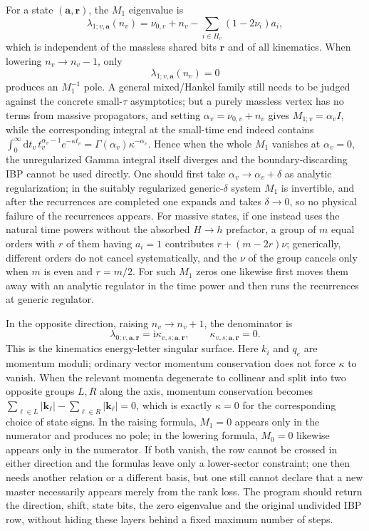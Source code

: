 \documentclass[11pt,a4paper]{article}
\newcommand{\dd}{\mathrm d}
\newcommand{\ii}{\mathrm i}
\begin{document}
For a state $(\bm a,\bm r)$, the $M_1$ eigenvalue is
\begin{equation}
 \lambda_{1;v,\bm a}(n_v)
 =\nu_{0,v}+n_v
 -\sum_{i\in H_v}(1-2\nu_i)a_i,
 \label{eq:M1-general-eigenvalue}
\end{equation}
which is independent of the massless shared bits $\bm r$ and of all kinematics. When lowering $n_v\to n_v-1$, only
\begin{equation}
 \lambda_{1;v,\bm a}(n_v)=0
 \label{eq:M1-lowering-resonance}
\end{equation}
produces an $M_1^{-1}$ pole. A general mixed/Hankel family still needs to be judged against the concrete small-$\tau$ asymptotics; but a purely massless vertex has no terms from massive propagators, and setting $\alpha_v=\nu_{0,v}+n_v$ gives $M_{1;v}=\alpha_v I$, while the corresponding integral at the small-time end indeed contains $\int_0^\infty\!\dd t_v\,t_v^{\alpha_v-1}e^{-\kappa t_v}=\Gamma(\alpha_v)\kappa^{-\alpha_v}$. Hence when the whole $M_1$ vanishes at $\alpha_v=0$, the unregularized Gamma integral itself diverges and the boundary-discarding IBP cannot be used directly. One should first take $\alpha_v\to\alpha_v+\delta$ as analytic regularization; in the suitably regularized generic-$\delta$ system $M_1$ is invertible, and after the recurrences are completed one expands and takes $\delta\to0$, so no physical failure of the recurrences appears. For massive states, if one instead uses the natural time powers without the absorbed $H\to h$ prefactor, a group of $m$ equal orders with $r$ of them having $a_i=1$ contributes $r+(m-2r)\nu$; generically, different orders do not cancel systematically, and the $\nu$ of the group cancels only when $m$ is even and $r=m/2$. For such $M_1$ zeros one likewise first moves them away with an analytic regulator in the time power and then runs the recurrences at generic regulator.

In the opposite direction, raising $n_v\to n_v+1$, the denominator is
\begin{equation}
 \lambda_{0;v,\bm a,\bm r}
 =\ii\kappa_{v,s;\bm a,\bm r},
 \qquad
 \kappa_{v,s;\bm a,\bm r}=0.
 \label{eq:M0-raising-resonance}
\end{equation}
This is the kinematics energy-letter singular surface. Here $k_i$ and $q_e$ are momentum moduli; ordinary vector momentum conservation does not force $\kappa$ to vanish. When the relevant momenta degenerate to collinear and split into two opposite groups $L,R$ along the axis, momentum conservation becomes $\sum_{\ell\in L}|\bm k_\ell|-\sum_{\ell\in R}|\bm k_\ell|=0$, which is exactly $\kappa=0$ for the corresponding choice of state signs. In the raising formula, $M_1=0$ appears only in the numerator and produces no pole; in the lowering formula, $M_0=0$ likewise appears only in the numerator. If both vanish, the row cannot be crossed in either direction and the formulas leave only a lower-sector constraint; one then needs another relation or a different basis, but one still cannot declare that a new master necessarily appears merely from the rank loss. The program should return the direction, shift, state bits, the zero eigenvalue and the original undivided IBP row, without hiding these layers behind a fixed maximum number of steps.
\end{document}
